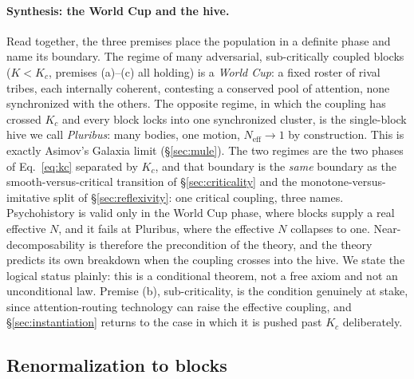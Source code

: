 \documentclass[11pt]{article}
\begin{document}
\paragraph{Synthesis: the World Cup and the hive.} Read together, the three premises place the population in a definite phase and name its boundary. The regime of many adversarial, sub-critically coupled blocks ($K<K_c$, premises (a)--(c) all holding) is a \emph{World Cup}: a fixed roster of rival tribes, each internally coherent, contesting a conserved pool of attention, none synchronized with the others. The opposite regime, in which the coupling has crossed $K_c$ and every block locks into one synchronized cluster, is the single-block hive we call \emph{Pluribus}: many bodies, one motion, $N_{\mathrm{eff}}\to 1$ by construction. This is exactly Asimov's Galaxia limit (\S\ref{sec:mule}). The two regimes are the two phases of Eq.~\eqref{eq:kc} separated by $K_c$, and that boundary is the \emph{same} boundary as the smooth-versus-critical transition of \S\ref{sec:criticality} and the monotone-versus-imitative split of \S\ref{sec:reflexivity}: one critical coupling, three names. Psychohistory is valid only in the World Cup phase, where blocks supply a real effective $N$, and it fails at Pluribus, where the effective $N$ collapses to one. Near-decomposability is therefore the precondition of the theory, and the theory predicts its own breakdown when the coupling crosses into the hive. We state the logical status plainly: this is a conditional theorem, not a free axiom and not an unconditional law. Premise (b), sub-criticality, is the condition genuinely at stake, since attention-routing technology can raise the effective coupling, and \S\ref{sec:instantiation} returns to the case in which it is pushed past $K_c$ deliberately.

\subsection{Renormalization to blocks}
\end{document}
